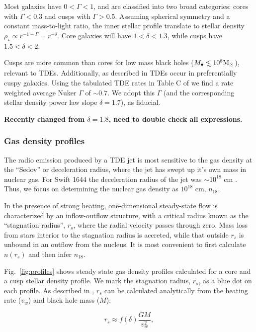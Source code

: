 \documentclass[usenatbib,fleqn]{mnras}
\newcommand\lsim{\mathrel{\rlap{\lower4pt\hbox{\hskip1pt$\sim$}}
    \raise1pt\hbox{$<$}}}
\newcommand{\Mbh}[1][]{M_{\bullet#1}}
\newcommand{\Msun}{{\rm M_\odot}}
\newcommand{\rs}{r_s}
\begin{document}
Most galaxies have $0<\Gamma<1$, and are classified into two broad
categories: cores with $\Gamma<0.3$ and cusps with
$\Gamma>0.5$. Assuming spherical symmetry and a constant mass-to-light
ratio, the inner stellar profile translate to stellar density
$\rho_\star\propto r^{-1-\Gamma}=r^{-\delta}$. Core galaxies will have
$1<\delta<1.3$, while cusps have $1.5<\delta<2$.

Cusps are more common than cores for low mass black holes ($\Mbh\lsim
10^{8} \Msun$), relevant to TDEs. Additionally, as described in
\citet{Stone&Metzger2016} TDEs occur in preferentially cuspy
galaxies. Using the tabulated TDE rates in Table C of
\citet{Stone&Metzger2016} we find a rate weighted average Nuker
$\Gamma$ of $\sim 0.7$. We adopt this $\Gamma$ (and the corresponding
stellar density power law slope $\delta=1.7$), as fiducial.

 {\bf Recently changed from $\delta=1.8$, need to
  double check all expressions.}

\subsubsection{Gas density profiles}
The radio emission produced by a TDE jet is most sensitive to the gas
density at the ``Sedov'' or deceleration radius, where the jet has
swept up it's own mass in nuclear gas. For Swift 1644 the deceleration
radius of the jet was $\sim 10^{18}$
cm \citep{Mimica+2015}. Thus, we focus on determining the nuclear gas
density as $10^{18}$ cm, $n_{18}$.  

In the presence of strong heating, one-dimensional steady-state flow
is characterized by an inflow-outflow structure, with a critical
radius known as the ``stagnation radius'', $\rs$, where the radial
velocity passes through zero.  Mass loss from stars interior to the
stagnation radius is accreted, while that outside $\rs$ is unbound in
an outflow from the nucleus.  It is most convenient to
first calculate $n(\rs)$ and then infer $n_{18}$. 

Fig.~\ref{fig:profiles} shows steady state gas density profiles
calculated for a core and a cusp stellar density profile. We mark the
stagnation radius, $r_s$, as a blue dot on each profile. As described
in \citet{Generozov+2015}, $r_s$ can be calculated analytically from the
heating rate ($v_w$) and black hole mass ($M$):

\begin{equation}
r_s \approx f(\delta) \frac{G M}{v_w^2},
\label{eq:rs}
\end{equation}
\end{document}
